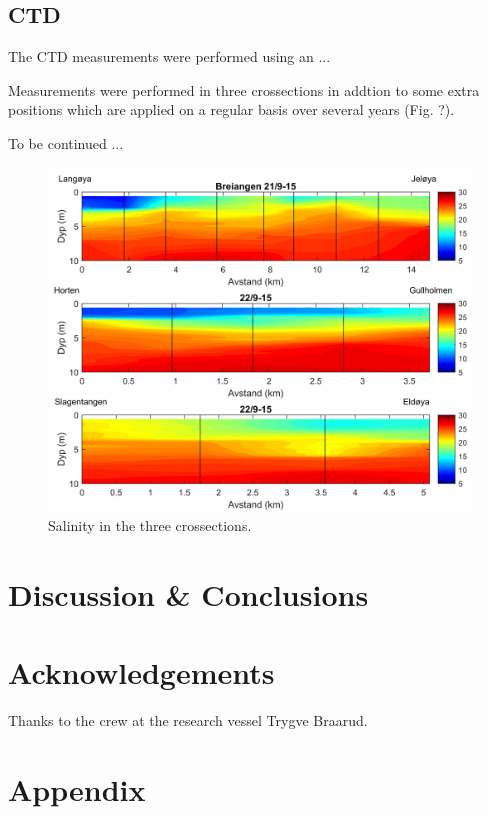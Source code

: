 \documentclass[12pt,a4paper,english]{article}
\begin{document}
\subsection{CTD}
The CTD measurements were performed using an ...

Measurements were performed in three crossections in addtion to some extra positions which are applied on a regular basis over several years (Fig. ?).

To be continued ...

\begin{figure}[ht]
\centerline{
\includegraphics*[width=\textwidth]{Figurer/Salt_snitt}}
\caption{\small
Salinity in the three crossections.}
\label{fig:CTD_Salt}
\end{figure}


\section{Discussion \& Conclusions}



\clearpage
\section*{\hspace{17mm}Acknowledgements}
Thanks to the crew at the research vessel Trygve Braarud.

\clearpage
\section*{\hspace{17mm}Appendix}
\end{document}
